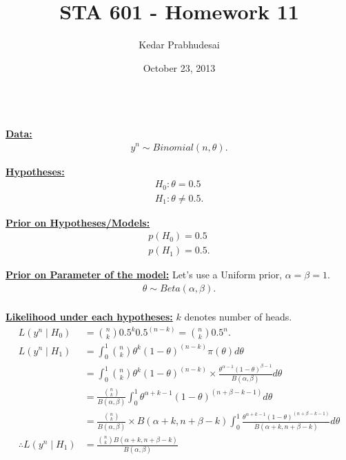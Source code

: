 \documentclass{article}
\title{STA 601 - Homework 11}
\author{Kedar Prabhudesai}
\date{October 23, 2013}
\begin{document}
\maketitle

\\

\underline{\textbf{Data:}}\\
\begin{align*}
y^n \sim Binomial(n,\theta).
\end{align*}

\underline{\textbf{Hypotheses:}}\\
\begin{align*}
H_0: \theta = 0.5\\
H_1: \theta \neq 0.5.
\end{align*}

\underline{\textbf{Prior on Hypotheses/Models:}}\\
\begin{align*}
p(H_0) = 0.5\\
p(H_1) = 0.5.
\end{align*}

\underline{\textbf{Prior on Parameter of the model:}} Let's use a Uniform prior, $\alpha = \beta = 1.$\\
\begin{align*}
\theta \sim Beta(\alpha,\beta).\\
\end{align*}

\underline{\textbf{Likelihood under each hypotheses:}} $k$ denotes number of heads.\\
\begin{align*}
L(y^n \mid H_0) &= \binom{n}{k}0.5^{k}0.5^{(n-k)} = \binom{n}{k}0.5^{n}.\\
L(y^n \mid H_1) &= \int_0^1{\binom{n}{k}\theta^{k}(1-\theta)^{(n-k)}\pi(\theta)}d\theta\\
&= \int_0^1{\binom{n}{k}\theta^{k}(1-\theta)^{(n-k)}}\times \frac{\theta^{\alpha-1}(1-\theta)^{\beta-1}}{B(\alpha,\beta)}d\theta\\
&= \frac{\binom{n}{k}}{B(\alpha,\beta)}\int_0^1{\theta^{\alpha+k-1}(1-\theta)^{(n+\beta-k-1)}}d\theta\\
&= \frac{\binom{n}{k}}{B(\alpha,\beta)}\times B(\alpha+k,n+\beta-k)\int_0^1{\frac{\theta^{\alpha+k-1}(1-\theta)^{(n+\beta-k-1)}}{B(\alpha+k,n+\beta-k)}}d\theta\\
\therefore L(y^n \mid H_1) &= \frac{\binom{n}{k}B(\alpha+k,n+\beta-k)}{B(\alpha,\beta)}
\end{align*}
\end{document}
